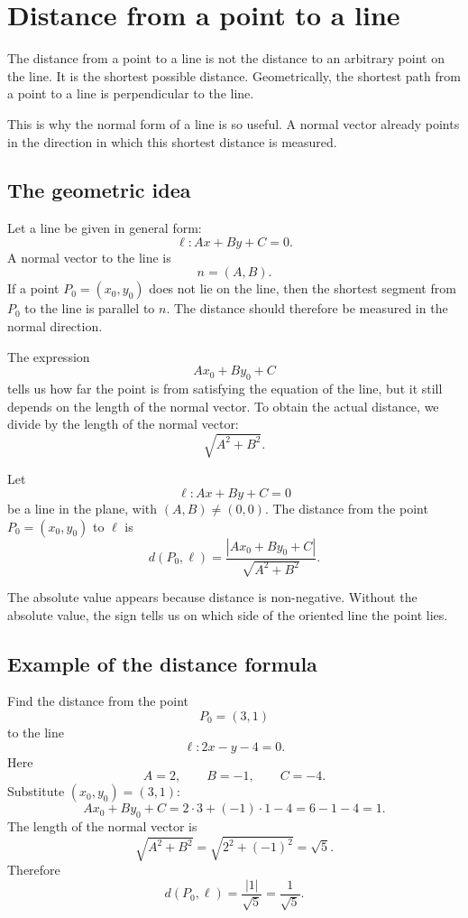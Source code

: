 \section{Distance from a point to a line}

The distance from a point to a line is not the distance to an arbitrary point on the line. It is the shortest possible distance. Geometrically, the shortest path from a point to a line is perpendicular to the line.

This is why the normal form of a line is so useful. A normal vector already points in the direction in which this shortest distance is measured.

\subsection*{The geometric idea}

Let a line be given in general form:
\[
\ell: Ax+By+C=0.
\]
A normal vector to the line is
\[
n=(A,B).
\]
If a point \(P_0=(x_0,y_0)\) does not lie on the line, then the shortest segment from \(P_0\) to the line is parallel to \(n\). The distance should therefore be measured in the normal direction.

The expression
\[
Ax_0+By_0+C
\]
tells us how far the point is from satisfying the equation of the line, but it still depends on the length of the normal vector. To obtain the actual distance, we divide by the length of the normal vector:
\[
\sqrt{A^2+B^2}.
\]

\begin{theorembox}
Let
\[
\ell: Ax+By+C=0
\]
be a line in the plane, with \((A,B)\ne(0,0)\). The distance from the point \(P_0=(x_0,y_0)\) to \(\ell\) is
\[
d(P_0,\ell)=\frac{|Ax_0+By_0+C|}{\sqrt{A^2+B^2}}.
\]
\end{theorembox}

The absolute value appears because distance is non-negative. Without the absolute value, the sign tells us on which side of the oriented line the point lies.

\subsection*{Example of the distance formula}

\begin{examplebox}
Find the distance from the point
\[
P_0=(3,1)
\]
to the line
\[
\ell: 2x-y-4=0.
\]
Here
\[
A=2,
\qquad
B=-1,
\qquad
C=-4.
\]
Substitute \((x_0,y_0)=(3,1)\):
\[
Ax_0+By_0+C=2\cdot3+(-1)\cdot1-4=6-1-4=1.
\]
The length of the normal vector is
\[
\sqrt{A^2+B^2}=\sqrt{2^2+(-1)^2}=\sqrt5.
\]
Therefore
\[
d(P_0,\ell)=\frac{|1|}{\sqrt5}=\frac1{\sqrt5}.
\]
\end{examplebox}

